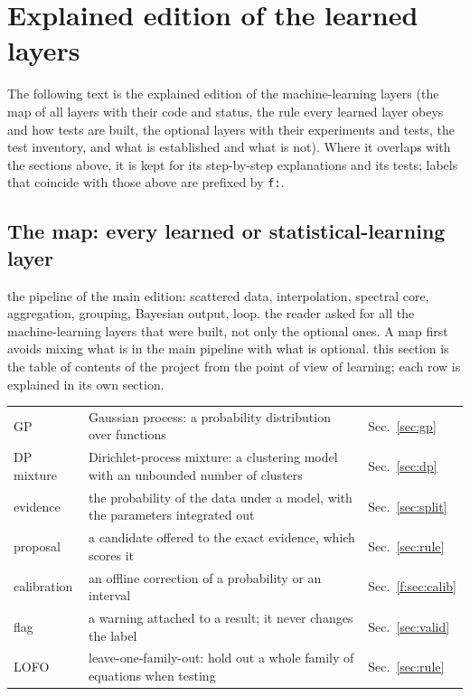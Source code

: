 \section{Explained edition of the learned layers}\label{app:explained-ml}
\noindent The following text is the explained edition of the machine-learning layers (the map of all layers with their code and status, the rule every learned layer obeys and how tests are built, the optional layers with their experiments and tests, the test inventory, and what is established and what is not). Where it overlaps with the sections above, it is kept for its step-by-step explanations and its tests; labels that coincide with those above are prefixed by \texttt{f:}.

\subsection{The map: every learned or statistical-learning layer}\label{sec:map}
\sectionbrief
{the pipeline of the main edition: scattered data, interpolation, spectral core, aggregation, grouping, Bayesian output, loop.}
{the reader asked for all the machine-learning layers that were built, not only the optional ones. A map first avoids mixing what is in the main pipeline with what is optional.}
{this section is the table of contents of the project from the point of view of learning; each row is explained in its own section.}

\begin{symbols}
\begin{tabular}{@{}L{2.6cm}L{6.0cm}L{4.3cm}@{}}
GP & Gaussian process: a probability distribution over functions & Sec.~\ref{sec:gp}\\
DP mixture & Dirichlet-process mixture: a clustering model with an unbounded number of clusters & Sec.~\ref{sec:dp}\\
evidence & the probability of the data under a model, with the parameters integrated out & Sec.~\ref{sec:split}\\
proposal & a candidate offered to the exact evidence, which scores it & Sec.~\ref{sec:rule}\\
calibration & an offline correction of a probability or an interval & Sec.~\ref{f:sec:calib}\\
flag & a warning attached to a result; it never changes the label & Sec.~\ref{sec:valid}\\
LOFO & leave-one-family-out: hold out a whole family of equations when testing & Sec.~\ref{sec:rule}\\
\end{tabular}
\end{symbols}

